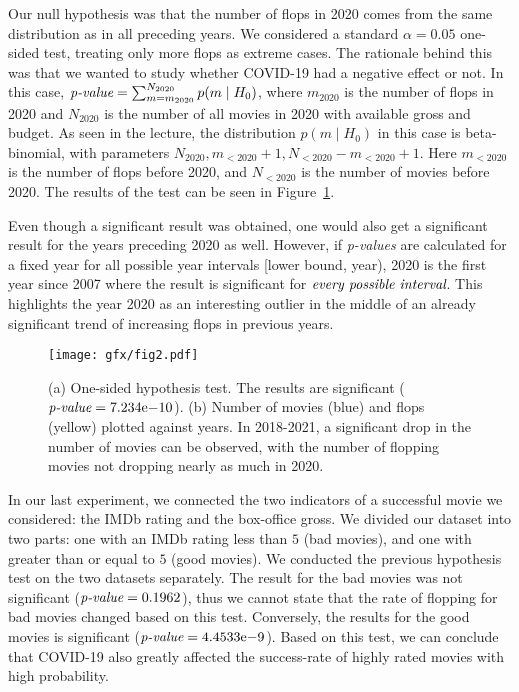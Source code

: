 \documentclass{article}
\begin{document}
Our null hypothesis was that the number of flops in 2020 comes from the same distribution as in all preceding years. We considered a standard $\alpha = 0.05$ one-sided test, treating only more flops as extreme cases. The rationale behind this was that we wanted to study whether COVID-19 had a negative effect or not. In this case, $\emph{p-value} = \sum_{m = m_{2020}}^{N_{2020}} p(m \mid H_0)$, where $m_{2020}$ is the number of flops in 2020 and $N_{2020}$ is the number of all movies in 2020 with available gross and budget. As seen in the lecture, the distribution $p(m \mid H_0)$ in this case is beta-binomial, with parameters $N_{2020}, m_{<2020} + 1, N_{<2020} - m_{<2020} + 1$. Here $m_{<2020}$ is the number of flops before 2020, and $N_{<2020}$ is the number of movies before 2020. The results of the test can be seen in Figure~\ref{fig:hyp}.

Even though a significant result was obtained, one would also get a significant result for the years preceding 2020 as well. However, if \emph{p-values} are calculated for a fixed year for all possible year intervals [lower bound, year), 2020 is the first year since 2007 where the result is significant for $\emph{every possible interval}$. This highlights the year 2020 as an interesting outlier in the middle of an already significant trend of increasing flops in previous years.

\begin{figure}
    \begin{center}
        \texttt{[image: gfx/fig2.pdf]}
    \end{center}
    \caption{(a) One-sided hypothesis test. The results are significant ($\emph{p-value} = 7.234\mathrm{e}{-10}$). (b) Number of movies (blue) and flops (yellow) plotted against years. In 2018-2021, a significant drop in the number of movies can be observed, with the number of flopping movies not dropping nearly as much in 2020.}
    \label{fig:hyp}
\end{figure}

In our last experiment, we connected the two indicators of a successful movie we considered: the IMDb rating and the box-office gross. We divided our dataset into two parts: one with an IMDb rating less than $5$ (bad movies), and one with greater than or equal to $5$ (good movies). We conducted the previous hypothesis test on the two datasets separately. The result for the bad movies was not significant ($\emph{p-value} = 0.1962$), thus we cannot state that the rate of flopping for bad movies changed based on this test. Conversely, the results for the good movies is significant ($\emph{p-value} = 4.4533\mathrm{e}{-9}$). Based on this test, we can conclude that COVID-19 also greatly affected the success-rate of highly rated movies with high probability.
\end{document}
